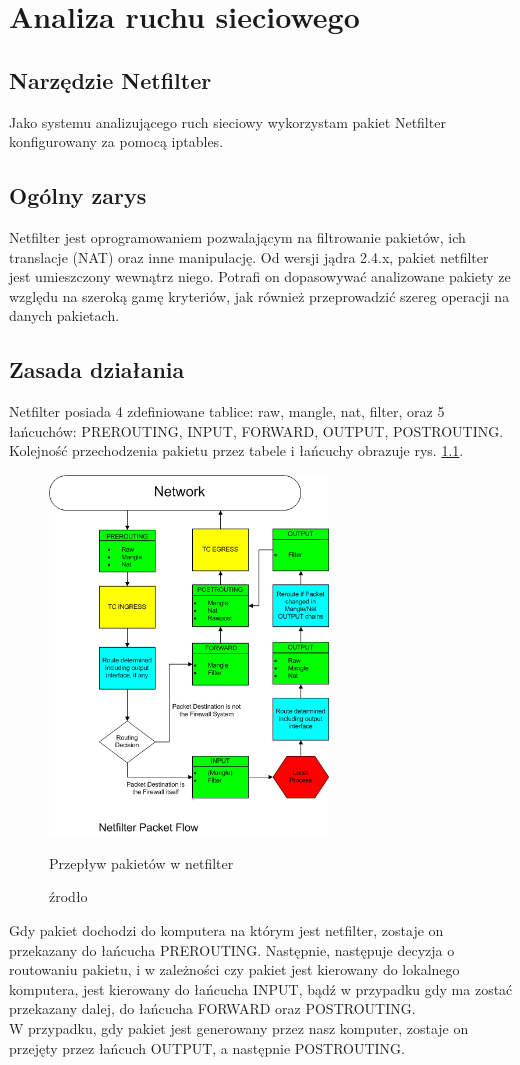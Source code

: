 \chapter{Analiza ruchu sieciowego}
	\label{chap:analiza}
	\section{Narzędzie Netfilter}
		Jako systemu analizującego ruch sieciowy wykorzystam pakiet Netfilter konfigurowany za pomocą iptables.
	\section{Ogólny zarys}
		Netfilter jest oprogramowaniem pozwalającym na filtrowanie pakietów, ich translacje (NAT) oraz inne manipulację.
		Od wersji jądra 2.4.x, pakiet netfilter jest umieszczony wewnątrz niego.
		Potrafi on dopasowywać analizowane pakiety ze względu na szeroką gamę kryteriów, jak również przeprowadzić szereg operacji na danych pakietach.
	\section{Zasada działania}
		Netfilter posiada 4 zdefiniowane tablice: raw, mangle, nat, filter, oraz 5 łańcuchów: PREROUTING, INPUT, FORWARD, OUTPUT, POSTROUTING.
		Kolejność przechodzenia pakietu przez tabele i łańcuchy obrazuje rys. \ref{fig:flowchart}.\\
		\begin{figure}[h]
			\centering
				\includegraphics[width=280px]{Netfilter.png}
				\caption{Przepływ pakietów w netfilter}
				\caption*{źrodło \cite{netfilter}}
				\label{fig:flowchart}
		\end{figure}
		Gdy pakiet dochodzi do komputera na którym jest netfilter, zostaje on przekazany do łańcucha PREROUTING. Następnie, następuje decyzja o routowaniu pakietu, i w zależności czy pakiet jest kierowany do lokalnego komputera, jest kierowany do łańcucha INPUT, bądź w przypadku gdy ma zostać przekazany dalej, do łańcucha FORWARD oraz POSTROUTING.\\
		W przypadku, gdy pakiet jest generowany przez nasz komputer, zostaje on przejęty przez łańcuch OUTPUT, a następnie POSTROUTING.

